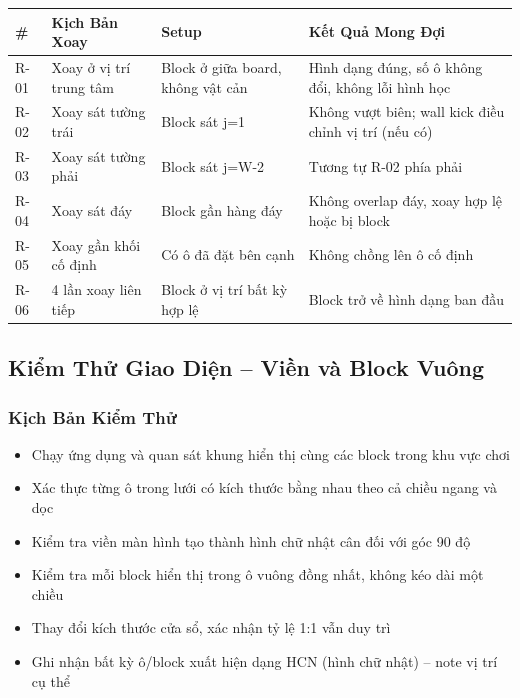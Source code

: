 \documentclass[12pt,a4paper]{article}
\begin{document}
\begin{table}[H]
\centering
{}
\begin{tabularx}{\linewidth}{|l|X|X|X|}
\hline
\rowcolor{gray!35}
\textbf{\#} & \textbf{Kịch Bản Xoay} & \textbf{Setup} & \textbf{Kết Quả Mong Đợi} \\ \hline
R-01 & Xoay ở vị trí trung tâm    & Block ở giữa board, không vật cản & Hình dạng đúng, số ô không đổi, không lỗi hình học \\ \hline
R-02 & Xoay sát tường trái        & Block sát j=1 & Không vượt biên; wall kick điều chỉnh vị trí (nếu có) \\ \hline
R-03 & Xoay sát tường phải        & Block sát j=W-2 & Tương tự R-02 phía phải \\ \hline
R-04 & Xoay sát đáy               & Block gần hàng đáy & Không overlap đáy, xoay hợp lệ hoặc bị block \\ \hline
R-05 & Xoay gần khối cố định      & Có ô đã đặt bên cạnh & Không chồng lên ô cố định \\ \hline
R-06 & 4 lần xoay liên tiếp       & Block ở vị trí bất kỳ hợp lệ & Block trở về hình dạng ban đầu \\ \hline
\end{tabularx}
\end{table}

\subsection{Kiểm Thử Giao Diện -- Viền và Block Vuông}


\subsubsection{Kịch Bản Kiểm Thử}
\begin{itemize}[leftmargin=3em]
  \item Chạy ứng dụng và quan sát khung hiển thị cùng các block trong khu vực chơi
  \item Xác thực từng ô trong lưới có kích thước bằng nhau theo cả chiều ngang và dọc
  \item Kiểm tra viền màn hình tạo thành hình chữ nhật cân đối với góc 90 độ
  \item Kiểm tra mỗi block hiển thị trong ô vuông đồng nhất, không kéo dài một chiều
  \item Thay đổi kích thước cửa sổ, xác nhận tỷ lệ 1:1 vẫn duy trì
  \item Ghi nhận bất kỳ ô/block xuất hiện dạng HCN (hình chữ nhật) – note vị trí cụ thể
\end{itemize}
\end{document}
